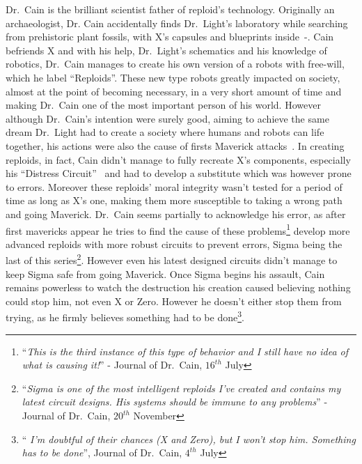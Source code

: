Dr.~Cain is the brilliant scientist father of reploid's technology. Originally an archaeologist, Dr. Cain accidentally finds Dr.~Light's laboratory while searching from prehistoric plant fossils, with X's capsules and blueprints inside~\cite{wiki:Cain_journal}-\cite{elysium_Cain_journal}. Cain befriends X and with his help, Dr.~Light's schematics and his knowledge of robotics, Dr.~Cain manages to create his own version of a robots with free-will, which he label ``Reploids''. These new type robots greatly impacted on society, almost at the point of becoming necessary, in a very short amount of time and making Dr.~Cain one of the most important person of his world. However although Dr.~Cain's intention were surely good, aiming to achieve the same dream Dr.~Light had to create a society where humans and robots can life together, his actions were also the cause of firsts Maverick attacks~\cite{book:MH_field_guide}. In creating reploids, in fact, Cain didn't manage to fully recreate X's components, especially his ``Distress Circuit''~\cite{book:RMZ_Complete_works} and had to develop a substitute which was however prone to errors. Moreover these reploids' moral integrity wasn't tested for a period of time as long as X's one, making them more susceptible to taking a wrong path and going Maverick. Dr.~Cain seems partially to acknowledge his error, as after first mavericks appear he tries to find the cause of these problems\footnote{``\textit{This is the third instance of this type of behavior and I still have no idea of what is causing it!}'' - Journal of Dr.~Cain, $16^{th}$ July} develop more advanced reploids with more robust circuits to prevent errors, Sigma being the last of this series\footnote{``\textit{Sigma is one of the most intelligent reploids I've created and contains my latest circuit designs. His systems should be immune to any problems}'' - Journal of Dr.~Cain, $20^{th}$ November}. However even his latest designed circuits didn't manage to keep Sigma safe from going Maverick. Once Sigma begins his assault, Cain remains powerless to watch the destruction his creation caused believing nothing could stop him, not even X or Zero. However he doesn't either stop them from trying, as  he firmly believes something had to be done\footnote{``\textit{ I'm doubtful of their chances (X and Zero), but I won't stop him. Something has to be done}'', Journal of Dr.~Cain, $4^{th}$ July}.

